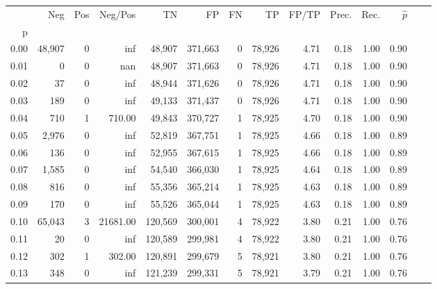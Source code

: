 \begin{tabular}{rrrrrrrrrrrrrr}
\toprule
{} &     Neg &     Pos &   Neg/Pos &       TN &       FP &      FN &      TP & FP/TP & Prec. &  Rec. & $\hat{p}$ \\
p    &         &         &           &          &          &         &         &       &       &       &           \\
\midrule
0.00 &  48,907 &       0 &       inf &   48,907 &  371,663 &       0 &  78,926 &  4.71 &  0.18 &  1.00 &      0.90 \\
0.01 &       0 &       0 &       nan &   48,907 &  371,663 &       0 &  78,926 &  4.71 &  0.18 &  1.00 &      0.90 \\
0.02 &      37 &       0 &       inf &   48,944 &  371,626 &       0 &  78,926 &  4.71 &  0.18 &  1.00 &      0.90 \\
0.03 &     189 &       0 &       inf &   49,133 &  371,437 &       0 &  78,926 &  4.71 &  0.18 &  1.00 &      0.90 \\
0.04 &     710 &       1 &    710.00 &   49,843 &  370,727 &       1 &  78,925 &  4.70 &  0.18 &  1.00 &      0.90 \\
0.05 &   2,976 &       0 &       inf &   52,819 &  367,751 &       1 &  78,925 &  4.66 &  0.18 &  1.00 &      0.89 \\
0.06 &     136 &       0 &       inf &   52,955 &  367,615 &       1 &  78,925 &  4.66 &  0.18 &  1.00 &      0.89 \\
0.07 &   1,585 &       0 &       inf &   54,540 &  366,030 &       1 &  78,925 &  4.64 &  0.18 &  1.00 &      0.89 \\
0.08 &     816 &       0 &       inf &   55,356 &  365,214 &       1 &  78,925 &  4.63 &  0.18 &  1.00 &      0.89 \\
0.09 &     170 &       0 &       inf &   55,526 &  365,044 &       1 &  78,925 &  4.63 &  0.18 &  1.00 &      0.89 \\
0.10 &  65,043 &       3 &  21681.00 &  120,569 &  300,001 &       4 &  78,922 &  3.80 &  0.21 &  1.00 &      0.76 \\
0.11 &      20 &       0 &       inf &  120,589 &  299,981 &       4 &  78,922 &  3.80 &  0.21 &  1.00 &      0.76 \\
0.12 &     302 &       1 &    302.00 &  120,891 &  299,679 &       5 &  78,921 &  3.80 &  0.21 &  1.00 &      0.76 \\
0.13 &     348 &       0 &       inf &  121,239 &  299,331 &       5 &  78,921 &  3.79 &  0.21 &  1.00 &      0.76 \\

\end{tabular}
